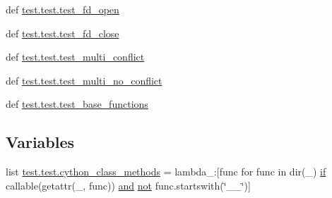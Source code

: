 \begin{DoxyCompactItemize}
\item 
def \hyperlink{namespacetest_1_1test_a4fa3f5c332f904314864dda770454707}{test.\-test.\-test\-\_\-fd\-\_\-open}
\item 
def \hyperlink{namespacetest_1_1test_a4a4058794c9eb1c211ed193251e286a8}{test.\-test.\-test\-\_\-fd\-\_\-close}
\item 
def \hyperlink{namespacetest_1_1test_a450c4f8f71bf5160a2c47ea69105fe55}{test.\-test.\-test\-\_\-multi\-\_\-conflict}
\item 
def \hyperlink{namespacetest_1_1test_a93122ebd19eef0c3e0cf563a5ff7d95a}{test.\-test.\-test\-\_\-multi\-\_\-no\-\_\-conflict}
\item 
def \hyperlink{namespacetest_1_1test_aed1bb8fba600acad2dace04dc456c409}{test.\-test.\-test\-\_\-base\-\_\-functions}
\end{DoxyCompactItemize}
\subsection*{Variables}
\begin{DoxyCompactItemize}
\item 
list \hyperlink{namespacetest_1_1test_a18514d16ae4f089a7629bd5805ef6123}{test.\-test.\-cython\-\_\-class\-\_\-methods} = lambda\-\_\-\-:\mbox{[}func for func in dir(\-\_\-) \hyperlink{mm__malloc_8h_a682140772a1d7d2744289e6abb2ad2ff}{if} callable(getattr(\-\_\-, func)) \hyperlink{iso646_8h_aa3d7d535cf450b91b9cb6d9cee2edbb9}{and} \hyperlink{iso646_8h_a31739c27bdcfdac9faae7bf7a5df49e4}{not} func.\-startswith(\char`\"{}\-\_\-\-\_\-\char`\"{})\mbox{]}
\end{DoxyCompactItemize}
